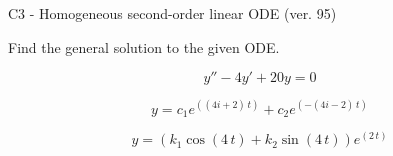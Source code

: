 \begin{exercise}
  \begin{exerciseTitle}C3 - Homogeneous second-order linear ODE (ver. 95)\end{exerciseTitle}
  \begin{exerciseStatement}
    
Find the general solution to the given ODE.

    
\[y''-4y'+20y = 0\]

  \end{exerciseStatement}
  \begin{exerciseAnswer}
    
\[y= c_{1} e^{\left(\left(4 i + 2\right) \, t\right)} + c_{2} e^{\left(-\left(4 i - 2\right) \, t\right)}\]

    
\[y= {\left(k_{1} \cos\left(4 \, t\right) + k_{2} \sin\left(4 \, t\right)\right)} e^{\left(2 \, t\right)}\]

  \end{exerciseAnswer}
\end{exercise}
